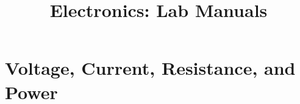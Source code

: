 \documentclass{book}
\title{Electronics: Lab Manuals}
\begin{document}
\maketitle

\chapter{Voltage, Current, Resistance, and Power}







\end{document}
